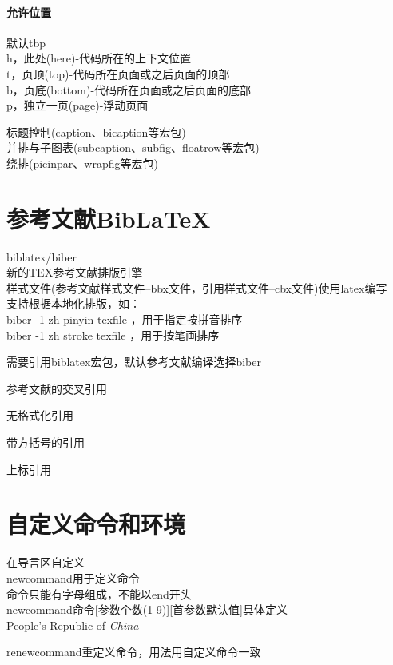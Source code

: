 \documentclass[UTF8]{article}  %
\newcommand\PRC{People's Republic of \emph{China}} %
\begin{document}
\paragraph{允许位置}
默认tbp\\
h，此处(here)-代码所在的上下文位置\\
t，页顶(top)-代码所在页面或之后页面的顶部\\
b，页底(bottom)-代码所在页面或之后页面的底部\\
p，独立一页(page)-浮动页面

标题控制(caption、bicaption等宏包)\\
并排与子图表(subcaption、subfig、floatrow等宏包)\\
绕排(picinpar、wrapfig等宏包)\\

\section{参考文献BibLaTeX}
 biblatex/biber\\
 新的TEX参考文献排版引擎\\
 样式文件(参考文献样式文件--bbx文件，引用样式文件--cbx文件)使用latex编写\\
 支持根据本地化排版，如：\\
 biber -1 zh pinyin texfile ，用于指定按拼音排序\\
 biber -1 zh stroke texfile ，用于按笔画排序

需要引用biblatex宏包，默认参考文献编译选择biber

参考文献的交叉引用\cite{__2000}

无格式化引用\cite{brown_long-term_2010}

带方括号的引用\parencite{huang_empirical_1998}

上标引用\supercite{perea_topological_2019}

\nocite{*} %
\printbibliography[title={参考文献}] %

\section{自定义命令和环境}
在导言区自定义\\
newcommand用于定义命令\\
命令只能有字母组成，不能以end开头\\
newcommand命令[参数个数(1-9)][首参数默认值]{具体定义}\\%
\PRC

renewcommand重定义命令，用法用自定义命令一致
\end{document}

